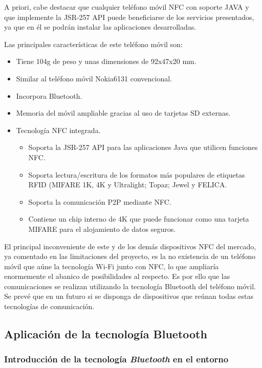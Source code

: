 A priori, cabe destacar que cualquier teléfono móvil NFC con soporte JAVA y que
implemente la JSR-257 API puede beneficiarse de los servicios presentados, ya 
que en él se podrán instalar las aplicaciones desarrolladas.

Las principales características de este teléfono móvil son:
\begin{itemize}
\item Tiene 104g de peso y unas dimensiones de 92x47x20 mm.
\item Similar al teléfono móvil Nokia6131 convencional.
\item Incorpora Bluetooth.
\item Memoria del móvil ampliable gracias al uso de tarjetas SD externas.
\item Tecnología NFC integrada.
  \begin{itemize}
  \item Soporta la JSR-257 API para las aplicaciones Java que utilicen 
  funciones NFC.
  \item Soporta lectura/escritura de los formatos más populares de etiquetas
  RFID (MIFARE 1K, 4K y Ultralight; Topaz; Jewel y FELICA.
  \item Soporta la comunicación P2P mediante NFC.
  \item Contiene un chip interno de 4K que puede funcionar como una tarjeta 
  MIFARE para el alojamiento de datos seguros.
  \end{itemize}
\end{itemize}

El principal inconveniente de este y de los demás dispositivos NFC del mercado, 
ya comentado en las limitaciones del proyecto, es la no existencia de un 
teléfono móvil que aúne la tecnología Wi-Fi junto con NFC, lo que ampliaría 
enormemente el abanico de posibilidades al respecto. Es por ello que las 
comunicaciones se realizan utilizando la tecnología Bluetooth del teléfono 
móvil. Se prevé que en un futuro si se disponga de dispositivos que reúnan 
todas estas tecnologías de comunicación.

  \subsection{Aplicación de la tecnología Bluetooth}
    \subsubsection{Introducción de la tecnología \emph{Bluetooth} en el
    entorno}

